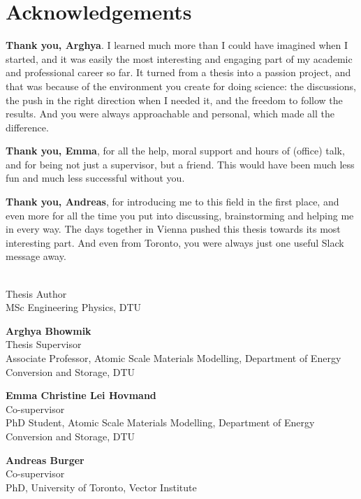 
\section*{Acknowledgements}

\textbf{Thank you, Arghya}. I learned much more than I could have imagined when I
started, and it was easily the most interesting and engaging part of my
academic and professional career so far. It turned from a thesis into a
passion project, and that was because of the environment you create for
doing science: the discussions, the push in the right direction when I
needed it, and the freedom to follow the results. And you were always
approachable and personal, which made all the difference.

\textbf{Thank you, Emma}, for all the help, moral support and hours of (office)
talk, and for being not just a supervisor, but a friend. This would have
been much less fun and much less successful without you.

\textbf{Thank you, Andreas}, for introducing me to this field in the first place, and
even more for all the time you put into discussing, brainstorming and
helping me in every way. The days together in Vienna pushed this thesis
towards its most interesting part. And even from Toronto, you were always
just one useful Slack message away.

\vspace{2em}

\newcommand{\person}[3]{\par\noindent\begin{minipage}{\linewidth}\raggedright
  \textbf{#1}\\[1pt]
  #2\\[1pt]
  #3
\end{minipage}\par\vspace{1.2em}}

\person{\thesisauthor}{Thesis Author}{MSc Engineering Physics, DTU}
\person{Arghya Bhowmik}{Thesis Supervisor}{Associate Professor, Atomic Scale Materials Modelling, Department of Energy Conversion and Storage, DTU}
\person{Emma Christine Lei Hovmand}{Co-supervisor}{PhD Student, Atomic Scale Materials Modelling, Department of Energy Conversion and Storage, DTU}
\person{Andreas Burger}{Co-supervisor}{PhD, University of Toronto, Vector Institute}
